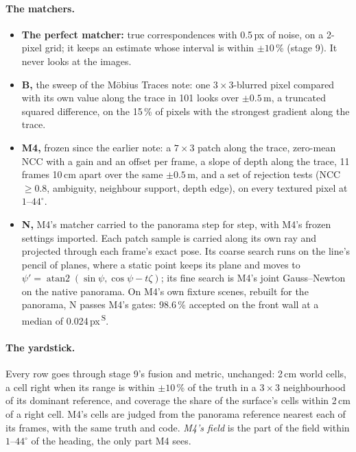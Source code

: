 \documentclass[11pt,a4paper]{article}
\newcommand{\src}[1]{\textsuperscript{\,#1}}
\newcommand{\SB}{\src{S}}   %
\begin{document}
\paragraph{The matchers.}
\begin{itemize}
\item \textbf{The perfect matcher:} true correspondences with 0.5\,px of noise, on a 2-pixel grid; it keeps an estimate
  whose interval is within $\pm10$\,\% (stage 9). It never looks at the images.
\item \textbf{B,} the sweep of the M\"obius Traces note: one $3\times3$-blurred pixel compared with its own value along the trace in
  101 looks over $\pm0.5$\,m, a truncated squared difference, on the 15\,\% of pixels with the strongest gradient along the
  trace.
\item \textbf{M4,} frozen since the earlier note: a $7\times3$ patch along the trace, zero-mean NCC with a gain and an offset
  per frame, a slope of depth along the trace, 11 frames 10\,cm apart over the same $\pm0.5$\,m, and a set of rejection
  tests (NCC $\ge0.8$, ambiguity, neighbour support, depth edge), on every textured pixel at $1$--$44^\circ$.
\item \textbf{N,} M4's matcher carried to the panorama step for step, with M4's frozen settings imported. Each patch
  sample is carried along its own ray and projected through each frame's exact pose. Its coarse search runs on the line's
  pencil of planes, where a static point keeps its plane and moves to $\psi'=\operatorname{atan2}(\sin\psi,\cos\psi-t\zeta)$;
  its fine search is M4's joint Gauss--Newton on the native panorama. On M4's own fixture scenes, rebuilt for the
  panorama, N passes M4's gates: 98.6\,\% accepted on the front wall at a median of 0.024\,px\SB.
\end{itemize}

\paragraph{The yardstick.} Every row goes through stage 9's fusion and metric, unchanged: 2\,cm world cells, a cell right
when its range is within $\pm10$\,\% of the truth in a $3\times3$ neighbourhood of its dominant reference, and coverage the
share of the surface's cells within 2\,cm of a right cell. M4's cells are judged from the panorama reference nearest each
of its frames, with the same truth and code. \emph{M4's field} is the part of the field within $1$--$44^\circ$ of the
heading, the only part M4 sees.
\end{document}
